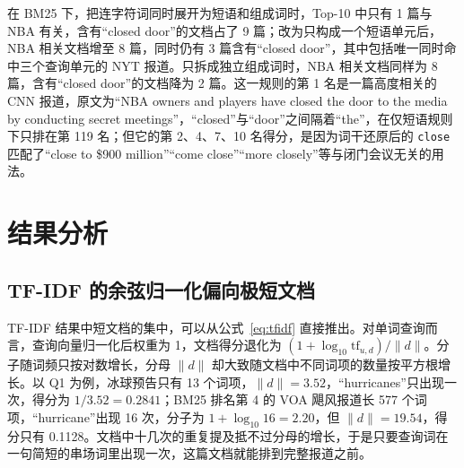 \documentclass[12pt,a4paper]{ctexart}
\begin{document}
\begin{table}[H]
\centering
\caption{Q5 中连字符词的三种处理规则（Top-10 中的文档数）}
\label{tab:hyphen}
\end{table}

在 BM25 下，把连字符词同时展开为短语和组成词时，Top-10 中只有 1 篇与 NBA 有关，含有“closed door”的文档占了 9 篇；改为只构成一个短语单元后，NBA 相关文档增至 8 篇，同时仍有 3 篇含有“closed door”，其中包括唯一同时命中三个查询单元的 NYT 报道。只拆成独立组成词时，NBA 相关文档同样为 8 篇，含有“closed door”的文档降为 2 篇。这一规则的第 1 名是一篇高度相关的 CNN 报道，原文为“NBA owners and players have closed the door to the media by conducting secret meetings”，“closed”与“door”之间隔着“the”，在仅短语规则下只排在第 119 名；但它的第 2、4、7、10 名得分，是因为词干还原后的 \texttt{close} 匹配了“close to \$900 million”“come close”“more closely”等与闭门会议无关的用法。

\section{结果分析}

\subsection{TF-IDF 的余弦归一化偏向极短文档}

TF-IDF 结果中短文档的集中，可以从公式~\eqref{eq:tfidf} 直接推出。对单词查询而言，查询向量归一化后权重为 1，文档得分退化为 $(1 + \log_{10}\mathrm{tf}_{u,d}) / \lVert d \rVert$。分子随词频只按对数增长，分母 $\lVert d \rVert$ 却大致随文档中不同词项的数量按平方根增长。以 Q1 为例，冰球预告只有 13 个词项，$\lVert d \rVert = 3.52$，“hurricanes”只出现一次，得分为 $1 / 3.52 = 0.2841$；BM25 排名第 4 的 VOA 飓风报道长 577 个词项，“hurricane”出现 16 次，分子为 $1 + \log_{10}16 = 2.20$，但 $\lVert d \rVert = 19.54$，得分只有 0.1128。文档中十几次的重复提及抵不过分母的增长，于是只要查询词在一句简短的串场词里出现一次，这篇文档就能排到完整报道之前。
\end{document}
